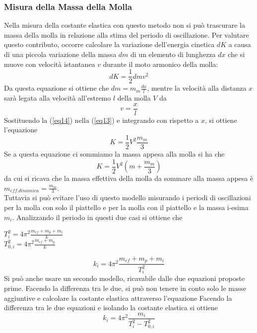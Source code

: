 \documentclass[a4paper]{article}
\begin{document}
\subsubsection{Misura della Massa della Molla}
Nella misura della costante elastica con questo metodo non si può trascurare la massa della molla in relazione alla stima del periodo di oscillazione. Per valutare questo contributo, occorre calcolare la variazione dell'energia cinetica $dK$ a causa di una piccola variazione della massa $dm$ di un elemento di lunghezza $dx$ che si muove con velocità istantanea $v$ durante il moto armonico della molla:
\begin{equation}\label{eq13}
    dK = \frac{1}{2} dm v^2
\end{equation}
Da questa equazione si ottiene che $dm=m_m\frac{dx}{l}$, mentre la velocità alla distanza $x$ sarà legata alla velocità all'estremo $l$ della molla $V$ da 
\begin{equation}\label{eq14}
    v = \frac{x}{l}
\end{equation}
Sostituendo la  (\ref{eq14}) nella (\ref{eq13}) e integrando con rispetto a $x$, si ottiene l'equazione 
\begin{equation}
    K =\frac{1}{2}V^2\frac{m_m}{3}
\end{equation}
Se a questa equazione ci sommiamo la massa appesa alla molla si ha che 
\begin{equation}
    K = \frac{1}{2}V^2(m+\frac{m_m}{3}) 
\end{equation}
da cui si ricava che la massa effettiva della molla da sommare alla massa appesa è $m_{eff.dinamica}=\frac{m_m}{3}$. \\
Tuttavia si può evitare l'uso di questo modello misurando i periodi di oscillazioni per la molla con solo il piattello e per la molla con il piattello e la massa i-esima $m_i$. Analizzando il periodo in questi due casi si ottiene che 
\begin{center}
        $T^2_i=4\pi^2\frac{m_{ef}+m_p+m_i}{k}$\\
        $T^2_{0,i}=4\pi^2\frac{m_{ef}+m_p}{k}$
\end{center}

\begin{equation}\label{eq17}
    k_i = 4\pi^2 \frac{m_{ef}+m_p+m_i}{T_i^2}
\end{equation}
Si può anche usare un secondo modello, ricavabile dalle due equazioni proposte prime. Facendo la differenza tra le due, si può non tenere in conto solo le masse aggiuntive e calcolare la costante elastica attraverso l'equazione
Facendo la differenza tra le due equazioni e isolando la costante elastica si ottiene
\begin{equation}\label{eq18}
    k_i=4\pi^2\frac{m_i}{T^2_i-T^2_{0,i}}
\end{equation}
\end{document}
